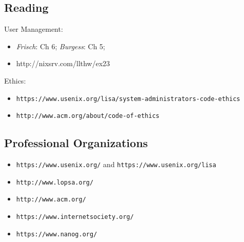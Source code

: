 \documentclass[xga]{xdvislides}
\begin{document}
\subsection{Reading}
User Management:
\begin{itemize}
	\item {\em Frisch}: Ch 6; {\em Burgess}: Ch 5;
\end{itemize}
\vspace{.5in}
\begin{itemize}
	\item http://nixsrv.com/llthw/ex23
\end{itemize}
\vspace{.5in}
Ethics:
\begin{itemize}
	\item \verb+https://www.usenix.org/lisa/system-administrators-code-ethics+
	\item \verb+http://www.acm.org/about/code-of-ethics+
\end{itemize}

\subsection{Professional Organizations}
\begin{itemize}
	\item \verb+https://www.usenix.org/+ and \verb+https://www.usenix.org/lisa+
	\item \verb+http://www.lopsa.org/+
	\item \verb+http://www.acm.org/+
	\item \verb+https://www.internetsociety.org/+
	\item \verb+https://www.nanog.org/+
\end{itemize}
\end{document}
